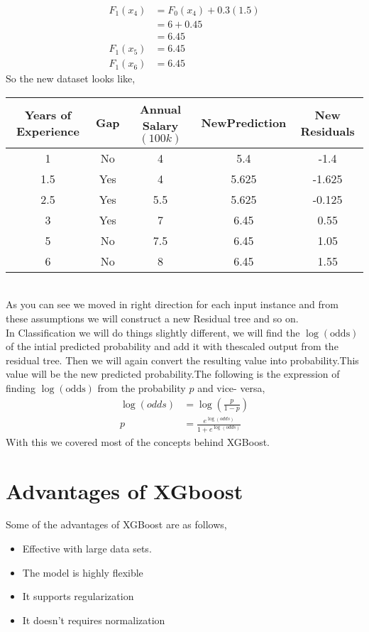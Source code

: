\documentclass[journal,12pt,onecolumn]{IEEEtran}
\providecommand{\brak}[1]{\ensuremath{\left(#1\right)}}
\theoremstyle{remark}
\numberwithin{equation}{section}
\begin{document}
\begin{enumerate}
\begin{align}
                               F_{1}\brak{x_4} &= F_{0}\brak{x_4} + 0.3\brak{1.5}\nonumber \\
			                       &= 6 + 0.45\nonumber \\
					       &= 6.45\\
			       F_{1}\brak{x_5} &= 6.45\\
			       F_{1}\brak{x_6} &= 6.45
			\end{align}
		So the new dataset looks like,\\
		\begin{tabular}{ccccc}
			Years of Experience & Gap & Annual Salary$\brak{100k}$ & NewPrediction & New Residuals \\
			\hline
			1 & No & 4 &  5.4 & -1.4\\
			1.5 & Yes & 4 & 5.625 & -1.625 \\
			2.5 & Yes & 5.5 & 5.625 & -0.125 \\
			3 & Yes & 7 & 6.45 & 0.55\\ 
			5 & No & 7.5 & 6.45 & 1.05 \\
			6 & No & 8  & 6.45 & 1.55\\
		\end{tabular}
		  \\
	           As you can see we moved in right direction for each input instance and from these assumptions we will construct a new Residual tree and so on.\\
		In Classification we will do things slightly different, we will find the $\log\brak{\text{odds}}$ of the intial predicted probability and add it with thescaled output from the residual tree. Then we will again convert the resulting value into probability.This value will be the new predicted probability.The following is the expression of finding $\log\brak{\text{odds}}$ from the probability $p$ and vice- versa,
		 \begin{align}
			 \log\brak{odds} &= \log\brak{\frac{p}{1-p}}\\
			  p &= \frac{e^{\log\brak{odds}}}{1 + e^{\log\brak{odds}}}
                 \end{align}
              With this we covered most of the concepts behind XGBoost.
   \end{enumerate}
           \section{Advantages of XGboost}
	     Some of the advantages of XGBoost are as follows,
	       \begin{itemize}
		\item Effective with large data sets.
	        \item The model is highly flexible
	        \item It supports regularization
	        \item It doesn't requires normalization
	       \end{itemize}
	     
\end{document}
